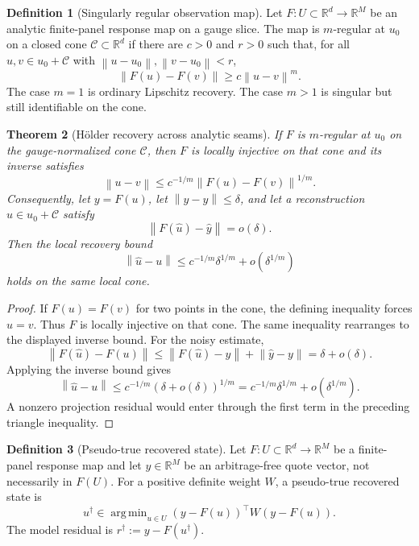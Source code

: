 \documentclass[11pt,a4paper]{amsart}
\theoremstyle{plain}
\newtheorem{theorem}{Theorem}[section]
\theoremstyle{definition}
\newtheorem{definition}[theorem]{Definition}
\theoremstyle{remark}
\DeclareMathOperator{\argmin}{arg\,min}
\newcommand{\R}{\mathbb{R}}
\newcommand{\cC}{\mathcal{C}}
\newcommand{\norm}[1]{\left\lVert #1\right\rVert}
\begin{document}
\begin{definition}[Singularly regular observation map]\label{def:singular-regular-map}
Let \(F:U\subset\R^d\to\R^M\) be an analytic finite-panel response map on a gauge slice.  The
map is \(m\)-regular at \(u_0\) on a closed cone \(\cC\subset\R^d\) if there are \(c>0\) and
\(r>0\) such that, for all \(u,v\in u_0+\cC\) with
\(\norm{u-u_0},\norm{v-u_0}<r\),
\[
        \norm{F(u)-F(v)}
        \ge
        c\norm{u-v}^m .
\]
The case \(m=1\) is ordinary Lipschitz recovery.  The case \(m>1\) is singular but still
identifiable on the cone.
\end{definition}

\begin{theorem}[H\"older recovery across analytic seams]\label{thm:holder-recovery-seams}
If \(F\) is \(m\)-regular at \(u_0\) on the gauge-normalized cone \(\cC\), then \(F\) is locally
injective on that cone and its inverse satisfies
\[
        \norm{u-v}
        \le
        c^{-1/m}\norm{F(u)-F(v)}^{1/m}.
\]
Consequently, let \(y=F(u)\), let \(\norm{\widehat y-y}\le\delta\), and let a reconstruction
\(\widehat u\in u_0+\cC\) satisfy
\[
        \norm{F(\widehat u)-\widehat y}=o(\delta).
\]
Then the local recovery bound
\[
        \norm{\widehat u-u}
        \le
        c^{-1/m}\delta^{1/m}+o(\delta^{1/m})
\]
holds on the same local cone.
\end{theorem}

\begin{proof}
If \(F(u)=F(v)\) for two points in the cone, the defining inequality forces \(u=v\).  Thus \(F\)
is locally injective on that cone.  The same inequality rearranges to the displayed inverse bound.
For the noisy estimate,
\[
        \norm{F(\widehat u)-F(u)}
        \le
        \norm{F(\widehat u)-\widehat y}
        +
        \norm{\widehat y-y}
        =
        \delta+o(\delta).
\]
Applying the inverse bound gives
\[
        \norm{\widehat u-u}
        \le
        c^{-1/m}(\delta+o(\delta))^{1/m}
        =
        c^{-1/m}\delta^{1/m}+o(\delta^{1/m}).
\]
A nonzero projection residual would enter through the first term in the preceding triangle
inequality.
\end{proof}

\begin{definition}[Pseudo-true recovered state]\label{def:pseudo-true-state}
Let \(F:U\subset\R^d\to\R^M\) be a finite-panel response map and let \(y\in\R^M\) be an
arbitrage-free quote vector, not necessarily in \(F(U)\).  For a positive definite weight \(W\),
a pseudo-true recovered state is
\[
        u^\dagger
        \in
        \argmin_{u\in U}
        (y-F(u))^\top W(y-F(u)).
\]
The model residual is \(r^\dagger:=y-F(u^\dagger)\).
\end{definition}
\end{document}
